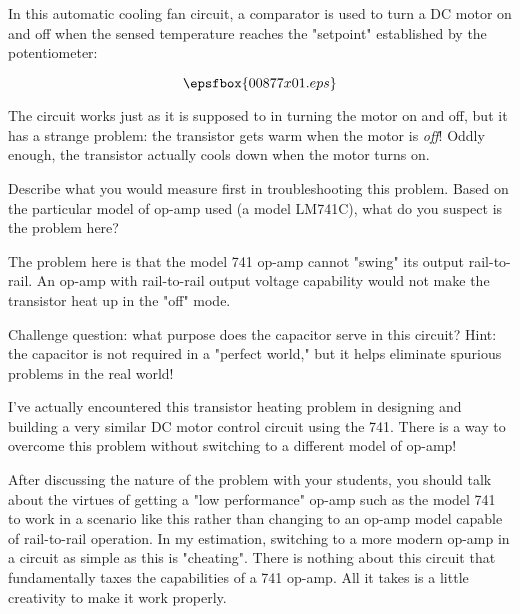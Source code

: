 

In this automatic cooling fan circuit, a comparator is used to turn a DC motor on and off when the sensed temperature reaches the "setpoint" established by the potentiometer:

$$\epsfbox{00877x01.eps}$$

The circuit works just as it is supposed to in turning the motor on and off, but it has a strange problem: the transistor gets warm when the motor is {\it off}!  Oddly enough, the transistor actually cools down when the motor turns on.  

Describe what you would measure first in troubleshooting this problem.  Based on the particular model of op-amp used (a model LM741C), what do you suspect is the problem here?







The problem here is that the model 741 op-amp cannot "swing" its output rail-to-rail.  An op-amp with rail-to-rail output voltage capability would not make the transistor heat up in the "off" mode.

\vskip 10pt

Challenge question: what purpose does the capacitor serve in this circuit?  Hint: the capacitor is not required in a "perfect world," but it helps eliminate spurious problems in the real world!







I've actually encountered this transistor heating problem in designing and building a very similar DC motor control circuit using the 741.  There is a way to overcome this problem without switching to a different model of op-amp! 

After discussing the nature of the problem with your students, you should talk about the virtues of getting a "low performance" op-amp such as the model 741 to work in a scenario like this rather than changing to an op-amp model capable of rail-to-rail operation.  In my estimation, switching to a more modern op-amp in a circuit as simple as this is "cheating".  There is nothing about this circuit that fundamentally taxes the capabilities of a 741 op-amp.  All it takes is a little creativity to make it work properly.




